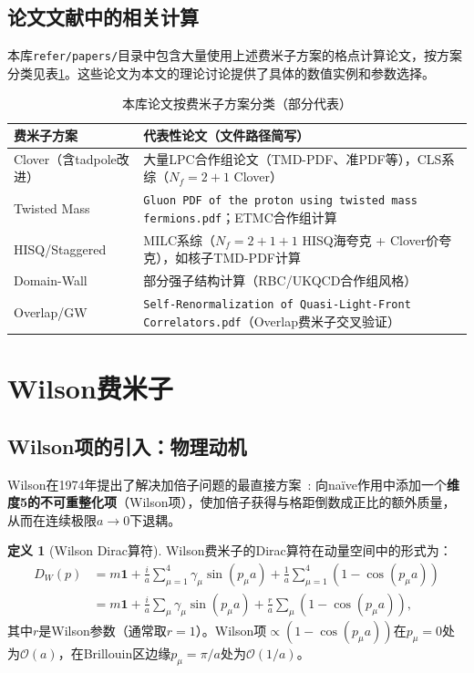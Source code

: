 \documentclass[12pt,a4paper]{ctexart}
\theoremstyle{definition}
\newtheorem{definition}{定义}[section]
\begin{document}
\subsection{论文文献中的相关计算}

本库\texttt{refer/papers/}目录中包含大量使用上述费米子方案的格点计算论文，按方案分类见表\ref{tab:fermion_papers}。这些论文为本文的理论讨论提供了具体的数值实例和参数选择。

\begin{table}[H]
\centering
\caption{本库论文按费米子方案分类（部分代表）}
\label{tab:fermion_papers}
\small
\begin{tabular}{ll}
\toprule
费米子方案 & 代表性论文（文件路径简写） \\
\midrule
Clover（含tadpole改进） & 大量LPC合作组论文（TMD-PDF、准PDF等），CLS系综（$N_f=2+1$ Clover） \\
Twisted Mass & \texttt{Gluon PDF of the proton using twisted mass fermions.pdf}；ETMC合作组计算 \\
HISQ/Staggered & MILC系综（$N_f=2+1+1$ HISQ海夸克 + Clover价夸克），如核子TMD-PDF计算 \\
Domain-Wall & 部分强子结构计算（RBC/UKQCD合作组风格） \\
Overlap/GW & \texttt{Self-Renormalization of Quasi-Light-Front Correlators.pdf}（Overlap费米子交叉验证） \\
\bottomrule
\end{tabular}
\end{table}

\section{Wilson费米子}

\subsection{Wilson项的引入：物理动机}

Wilson在1974年提出了解决加倍子问题的最直接方案~\cite{Wilson1974}: 向na\"ive作用中添加一个\textbf{维度5的不可重整化项}（Wilson项），使加倍子获得与格距倒数成正比的额外质量，从而在连续极限$a\to 0$下退耦。

\begin{definition}[Wilson Dirac算符]
Wilson费米子的Dirac算符在动量空间中的形式为：
\begin{equation}
\begin{aligned}
D_W(p) &= m\mathbf{1} + \frac{i}{a}\sum_{\mu=1}^4 \gamma_\mu \sin(p_\mu a) + \frac{1}{a}\sum_{\mu=1}^4 (1 - \cos(p_\mu a)) \\
&= m\mathbf{1} + \frac{i}{a}\sum_\mu \gamma_\mu \sin(p_\mu a) + \frac{r}{a}\sum_\mu (1 - \cos(p_\mu a)),
\label{eq:wilson_momentum}
\end{aligned}
\end{equation}
其中$r$是Wilson参数（通常取$r=1$）。Wilson项$\propto (1-\cos(p_\mu a))$在$p_\mu=0$处为$\mathcal{O}(a)$，在Brillouin区边缘$p_\mu=\pi/a$处为$\mathcal{O}(1/a)$。
\end{definition}
\end{document}
